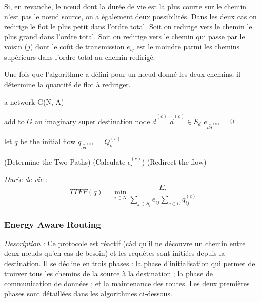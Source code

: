 Si, en revanche, le nœud dont la durée de vie est la plus courte sur le chemin n'est pas le nœud source, on a également deux possibilités. Dans les deux cas on redirige le flot le plus petit dans l'ordre total. Soit on redirige vers le chemin le plus grand dans l'ordre total. Soit on redirige vers le chemin qui passe par le voisin ($j$) dont le coût de transmission $e_{ij}$ est le moindre parmi les chemins supérieurs dans l'ordre total au chemin redirigé.

Une fois que l'algorithme a défini pour un nœud donné les deux chemins, il détermine la quantité de flot à rediriger.

\begin{algorithm}[H]
\caption{$FR()$}
\label{algo_FR}
\begin{algorithmic}
\REQUIRE a network G(N, A)

add to $G$ an imaginary super destination node $\tilde{d}^{(c)}$
	\STATE $\tilde{d}^{(c)} \in S_d$
	\STATE $e_{d \tilde{d}^{(c)}} = 0$
\ENDFOR

let $q$ be the initial flow
	\STATE $q_{o \tilde{d}^{(c)}} = Q_o^{(c)}$
\ENDFOR

		\STATE (Determine the Two Paths)
		\STATE (Calculate $\epsilon_i^{(c)}$)
		\STATE (Redirect the flow)
	\ENDFOR
\ENDFOR

\RETURN 
\end{algorithmic}
\end{algorithm}



\emph{Durée de vie} :  $$TTFF(q) = \min\limits_{i \in N}\frac{E_i}{\sum \limits_{j \in S_i} {e_{ij}} \sum \limits_{c \in C} {q_{ij}^{(c)}}}$$



\subsubsection{Energy Aware Routing \cite{Shah2002}}

\emph{Description :}
Ce protocole est réactif (càd qu'il ne découvre un chemin entre deux nœuds qu’en cas de besoin) et les requêtes sont initiées depuis la destination. Il se décline en trois phases : la phase d'initialisation qui permet de trouver tous les chemins de la source à la destination ; la phase de communication de données ; et la maintenance des routes. Les deux premières phases sont détaillées dans les algorithmes ci-dessous.

